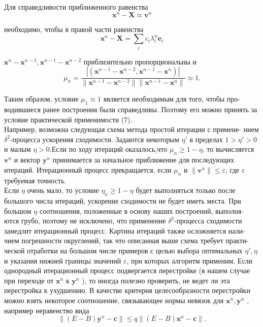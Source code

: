 \documentclass[a4paper, twoside, 12pt]{article}
\begin{document}
\begin{adjustwidth}{1cm}{0cm}
\begin{small}
    Для справедливости приближенного равенства
    \[
    \textbf{x}^n - \textbf{X} \approx \textbf{v}^n
    \]

необходимо, чтобы в правой части равенства
\[
\textbf{x}^n - \textbf{X} = \sum \limits_{i}c_{i}\lambda_{i}^{n}\textbf{e}_{i}
\]

$\textbf{x}^n-\textbf{x}^{n-1}, \textbf{x}^{n-1} - \textbf{x}^{n-2}$ приблизительно пропорциональны и
\[
\mu_{n} = \frac{\left|(\textbf{x}^{n-1} - \textbf{x}^{n-2}, \textbf{x}^{n-1} - \textbf{x}^n)\right|}{\|\textbf{x}^{n-1} - \textbf{x}^{n-2}\| \|\textbf{x}^{n-1} - \textbf{x}^n \| }\approx 1.
\]
\end{small}
\end{adjustwidth}

Таким образом, условие $\mu_{1} \approx 1$ является необходимым для того, чтобы про- водившиеся ранее построения были справедливы. Поэтому его можно принять за условие практической применимости (7).
\\ \noindent
Например, возможна следующая схема метода простой итерации с примене-
нием $\delta^{2}$-процесса ускорения сходимости. Задаются некоторым $\eta'$ в пределах
$1>\eta′ >0$ и малым $\eta>0$.Если по ходу итераций оказалось,что $\mu_{n} \geqslant 1 - \eta$, 
то вычисляется $\textbf{v}^n$ и вектор $\textbf{y}^n$ принимается за начальное приближение для последующих итераций. Итерационный процесс прекращается, если $\mu_{n}$ и $\|\textbf{v}^n\| \leqslant \varepsilon$, где $\varepsilon$ требуемая точность.
\\
\noindent
Если $\eta$ очень мало, то условие $\eta_{n} \geqslant 1 - \eta$ будет выполняться только после
большого числа итераций, ускорение сходимости не будет иметь места. При
большом $\eta$ соотношения, положенные в основу наших построений, выполня-
ются грубо, поэтому не исключено, что применение $\delta^2$-процесса сходимости
замедлит итерационный процесс. Картина итераций также осложняется нали-
чием погрешности округлений, так что описанная выше схема требует практи-
ческой отработки на большом числе примеров с целью выбора оптимальных
$\eta', \eta$ и указания нижней границы значений $\varepsilon$, при которых алгоритм применим. Если однородный итерационный процесс подвергается перестройке (в нашем случае при переходе от $\textbf{x}^n$ к $\textbf{y}^n$ ), то иногда полезно проверить, не ведет ли эта перестройка к ухудшению. В качестве критерия целесообразности перестройки можно взять некоторое соотношение, связывающее нормы невязок для $\textbf{x}^n, \textbf{y}^n$ , например неравенство вида
\[
\|(E - B)\textbf{y}^n - \textbf{c}\| \leqslant q \|(E - B)\textbf{x}^n - \textbf{c} \|.
\]
\end{document}
